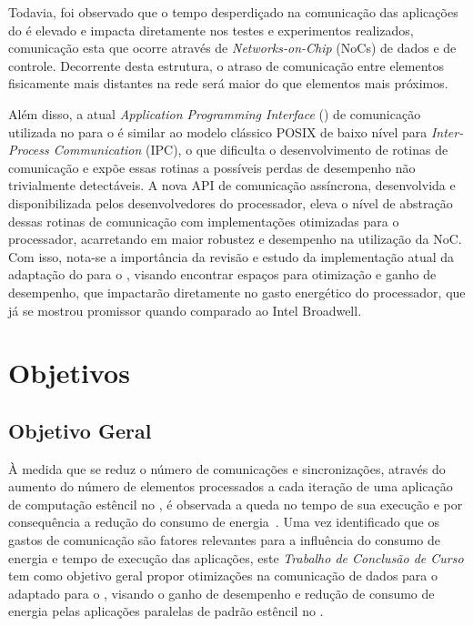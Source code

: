 Todavia, foi observado que o tempo desperdiçado na comunicação das aplicações do \mppa é elevado e impacta diretamente nos testes e experimentos realizados, comunicação esta que ocorre através de \textit{Networks-on-Chip} (NoCs) de dados e de controle. Decorrente desta estrutura, o atraso de comunicação entre elementos fisicamente mais distantes na rede será maior do que elementos mais próximos.

Além disso, a atual \textit{Application Programming Interface} (\api) de comunicação utilizada no \pskel para o \mppa é similar ao modelo clássico POSIX de baixo nível para \textit{Inter-Process Communication} (IPC), o que dificulta o desenvolvimento de rotinas de comunicação e expõe essas rotinas a possíveis perdas de desempenho não trivialmente detectáveis. A nova API de comunicação assíncrona, desenvolvida e disponibilizada pelos desenvolvedores do processador, eleva o nível de abstração dessas rotinas de comunicação com implementações otimizadas para o processador, acarretando em maior robustez e desempenho na utilização da NoC. Com isso, nota-se a importância da revisão e estudo da implementação atual da adaptação do \fw \pskel para o \mppa, visando encontrar espaços para otimização e ganho de desempenho, que impactarão diretamente no gasto energético do processador, que já se mostrou promissor quando comparado ao Intel Broadwell. 

\section{Objetivos}
\label{sec:objetivos}

\subsection{Objetivo Geral}
\label{subsec:objetivos-gerais}

À medida que se reduz o número de comunicações e sincronizações, através do aumento do número de elementos processados a cada iteração de uma aplicação de computação estêncil no \mppa, é observada a queda no tempo de sua execução e por consequência a redução do consumo de energia~\cite{wscad2017}. Uma vez identificado que os gastos de comunicação são fatores relevantes para a influência do consumo de energia e tempo de execução das aplicações, este \textit{Trabalho de Conclusão de Curso} tem como objetivo geral propor otimizações na comunicação de dados para o \fw \pskel adaptado para o \mppa, visando o ganho de desempenho e redução de consumo de energia pelas aplicações paralelas de padrão estêncil no \mppa.

